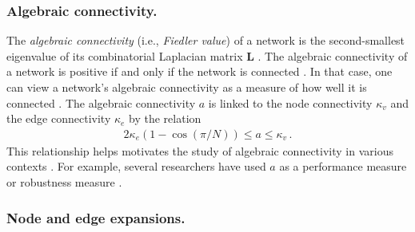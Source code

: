 \documentclass{comnet-mod}
\begin{document}
\subsubsection{Algebraic connectivity.}\label{sec:algebraic-connectivity}

The \textit{algebraic connectivity} (i.e., \textit{Fiedler value}) of a network is the second-smallest eigenvalue of its combinatorial Laplacian matrix $\mathbf L$ \cite{Estrada2015}. The algebraic connectivity of a network is positive if and only if the network is connected \cite{Jamakovic2007}. In that case, one can view a network's algebraic connectivity as a measure of how well it is connected \cite{deAbreu2007}. The algebraic connectivity $a$ is linked to the node connectivity $\kappa_v$ and the edge connectivity $\kappa_e$ by the relation \cite{Cvetkovic1980, VanMieghem2005}
\begin{align}
	2\kappa_e\left(1-\cos\left(\pi/N\right)\right)\leq a\leq \kappa_v\,.\nonumber
\end{align}
This relationship helps motivates the study of algebraic connectivity in various contexts \cite{Fiedler1973, Mohar1991, Jamakovic2007, Jamakovic2007a, Spielman2007, deAbreu2007}. For example, several researchers have used $a$ as a performance measure \cite{Yazdani2011, Bilal2013, Yamashita2019} or robustness measure \cite{VanMieghem2005, Jamakovic2007, Jamakovic2007a, Bigdeli2009, Martin2014, Wang2018, VanMieghem2023}.


\subsubsection{Node and edge expansions.}
\end{document}
